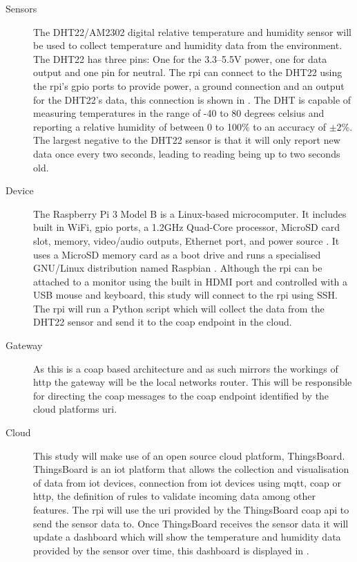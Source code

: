 \begin{description}
    \item[Sensors] 
    The DHT22/AM2302 digital relative temperature and humidity 
    sensor will be used to collect temperature and humidity data from the environment.
    The DHT22 has three pins: One for the 3.3--5.5V power, one for data output and
    one pin for neutral. The \gls{rpi} can connect to the DHT22 using the \gls{rpi}'s 
    \gls{gpio} ports to provide power, a ground connection and an output for the 
    DHT22's data, this connection is shown in . The DHT 
    is capable of measuring temperatures in the range of -40 to 80 degrees celsius
    and reporting a relative humidity of between 0 to 100\% to an accuracy of $\pm2$\%.
    The largest negative to the DHT22 sensor is that it will only report new data
    once every two seconds, leading to reading being up to two seconds old.

    \item[Device]
    The Raspberry Pi 3 Model B is a Linux-based microcomputer.
    It includes built in WiFi, \gls{gpio} ports, a 1.2GHz Quad-Core processor,
    MicroSD card slot, memory, video/audio outputs, Ethernet port, and power source 
    \citep{pi_model_2018}. 
    It uses a MicroSD memory card as a boot drive and runs a specialised 
    GNU/Linux distribution named Raspbian \citep{raspbian_raspbian_2018}. Although the \gls{rpi} can be attached
    to a monitor using the built in HDMI port and controlled with a USB mouse and
    keyboard, this study will connect to the \gls{rpi} using SSH. The \gls{rpi} 
    will run a Python script which will collect the data from the DHT22 sensor 
    and send it to the \gls{coap} endpoint in the cloud.

    \item[Gateway]
    As this is a \gls{coap} based architecture and as such mirrors the workings
    of \gls{http} the gateway will be the local networks router. This will be 
    responsible for directing the \gls{coap} messages to the \gls{coap} endpoint
    identified by the cloud platforms \gls{uri}.

    \item[Cloud]
    This study will make use of an open source cloud platform, ThingsBoard.
    ThingsBoard is an \gls{iot} platform that allows the collection and 
    visualisation of data from \gls{iot} devices, connection from \gls{iot} devices
    using \gls{mqtt}, \gls{coap} or \gls{http}, the definition of rules to validate
    incoming data among other features. The \gls{rpi} will use the \gls{uri} 
    provided by the ThingsBoard \gls{coap} \gls{api} to send the sensor data to.
    Once ThingsBoard receives the sensor data it will update a dashboard which
    will show the temperature and humidity data provided by the sensor over time,
    this dashboard is displayed in .

\end{description}

